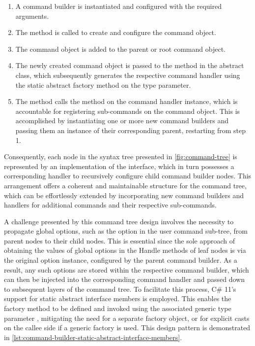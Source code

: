 \begin{enumerate}
    \item A command builder is instantiated and configured with the required arguments.
    \item The  method is called to create and configure the  command object.
    \item The command object is added to the parent or root command object.
    \item The newly created command object is passed to the  method in the abstract  class, which subsequently generates the respective command handler using the static abstract  factory method on the  type parameter.
    \item The  method calls the  method on the command handler instance, which is accountable for registering sub-commands on the  command object. This is accomplished by instantiating one or more new command builders and passing them an instance of their corresponding parent, restarting from step 1.
\end{enumerate}

Consequently, each node in the syntax tree presented in \cref{fig:command-tree} is represented by an implementation of the  interface, which in turn possesses a corresponding handler to recursively configure child command builder nodes. This arrangement offers a coherent and maintainable structure for the command tree, which can be effortlessly extended by incorporating new command builders and handlers for additional commands and their respective sub-commands.

A challenge presented by this command tree design involves the necessity to propagate global options, such as the  option in the user command sub-tree, from parent nodes to their child nodes. This is essential since the sole approach of obtaining the values of global options in the Handle methods of leaf nodes is via the original  option instance, configured by the parent command builder. As a result, any such options are stored within the respective command builder, which can then be injected into the corresponding command handler and passed down to subsequent layers of the command tree. To facilitate this process, C\# 11's support for static abstract interface members is employed. This enables the  factory method to be defined and invoked using the associated generic type parameter , mitigating the need for a separate factory object, or for explicit casts on the callee side if a generic factory is used. This design pattern is demonstrated in \cref{lst:command-builder-static-abstract-interface-members}.

